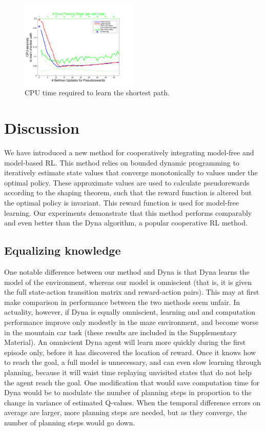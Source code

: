 \documentclass[letterpaper]{article}
\begin{document}
\begin{figure}[H]
\centering
\includegraphics[width=0.5\textwidth]{MC_cpus_vs_PRiterations_DYNA_toGoal}
\caption{CPU time required to learn the shortest path.}
\label{fig:mc2}
\end{figure}

\section{Discussion}

We have introduced a new method for cooperatively integrating model-free and model-based RL. This method relies on bounded dynamic programming to iteratively estimate state values that converge monotonically to values under the optimal policy. These approximate values are used to calculate pseudorewards according to the shaping theorem, such that the reward function is altered but the optimal policy is invariant. This reward function is used for model-free learning. Our experiments demonstrate that this method performs comparably and even better than the Dyna algorithm, a popular cooperative RL method.

\subsection{Equalizing knowledge}

One notable difference between our method and Dyna is that Dyna learns the model of the environment, whereas our model is omniscient (that is, it is given the full state-action transition matrix and reward-action pairs). This may at first make comparison in performance between the two methods seem unfair. In actuality, however, if Dyna is equally omniscient, learning and and computation performance improve only modestly in the maze environment, and become worse in the mountain car task (these results are included in the Supplementary Material). An omniscient Dyna agent will learn more quickly during the first episode only, before it has discovered the location of reward. Once it knows how to reach the goal, a full model is unnecessary, and can even slow learning through planning, because it will waist time replaying unvisited states that do not help the agent reach the goal. One modification that would save computation time for Dyna would be to modulate the number of planning steps in proportion to the change in variance of estimated Q-values. When the temporal difference errors on average are larger, more planning steps are needed, but as they converge, the number of planning steps would go down.
\end{document}
